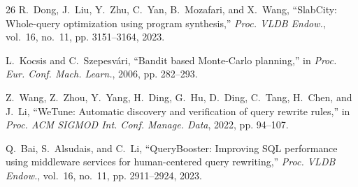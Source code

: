 \documentclass[conference]{IEEEtran}
\begin{document}
\begin{thebibliography}{26}
R.~Dong, J.~Liu, Y.~Zhu, C.~Yan, B.~Mozafari, and X.~Wang, ``SlabCity: Whole-query optimization using program synthesis,'' \emph{Proc. VLDB Endow.}, vol.~16, no.~11, pp. 3151--3164, 2023.

L.~Kocsis and C.~Szepesv\'ari, ``Bandit based Monte-Carlo planning,'' in \emph{Proc. Eur. Conf. Mach. Learn.}, 2006, pp. 282--293.

Z.~Wang, Z.~Zhou, Y.~Yang, H.~Ding, G.~Hu, D.~Ding, C.~Tang, H.~Chen, and J.~Li, ``WeTune: Automatic discovery and verification of query rewrite rules,'' in \emph{Proc. ACM SIGMOD Int. Conf. Manage. Data}, 2022, pp. 94--107.

Q.~Bai, S.~Alsudais, and C.~Li, ``QueryBooster: Improving SQL performance using middleware services for human-centered query rewriting,'' \emph{Proc. VLDB Endow.}, vol.~16, no.~11, pp. 2911--2924, 2023.

\end{thebibliography}
\end{document}
